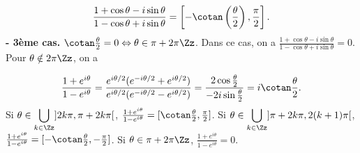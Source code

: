 {{$$\frac{1+\cos\theta-i\sin\theta}{1-\cos\theta+i\sin\theta}=\left[-\cotan\left(\frac{\theta}{2}\right),\frac{\pi}{2}\right].$$
\textbf{- 3ème cas.} $\cotan\frac{\theta}{2}=0\Leftrightarrow\theta\in\pi+2\pi\Zz$. Dans ce cas, on
a $\frac{1+\cos\theta-i\sin\theta}{1-\cos\theta+i\sin\theta}=0$.
Pour $\theta\notin2\pi\Zz$, on a

$$\frac{1+e^{i\theta}}{1-e^{i\theta}}=\frac{e^{i\theta/2}(e^{-i\theta/2}+e^{i\theta/2})}{e^{i\theta/2}(e^{-i\theta/2}-
e^{i\theta/2})}=\frac{2\cos\frac{\theta}{2}}{-2i\sin\frac{\theta}{2}}=i\cotan\frac{\theta}{2}.$$
Si $\theta\in\displaystyle\bigcup_{k\in\Zz}]2k\pi,\pi+2k\pi[$,
$\frac{1+e^{i\theta}}{1-e^{i\theta}}=[\cotan\frac{\theta}{2},\frac{\pi}{2}]$.
Si $\theta\in\displaystyle\bigcup_{k\in\Zz}]\pi+2k\pi,2(k+1)\pi[$,
$\frac{1+e^{i\theta}}{1-e^{i\theta}}=[-\cotan\frac{\theta}{2},-\frac{\pi}{2}]$.
Si $\theta\in\pi+2\pi\Zz$, $\frac{1+e^{i\theta}}{1-e^{i\theta}}=0$.
}
}
